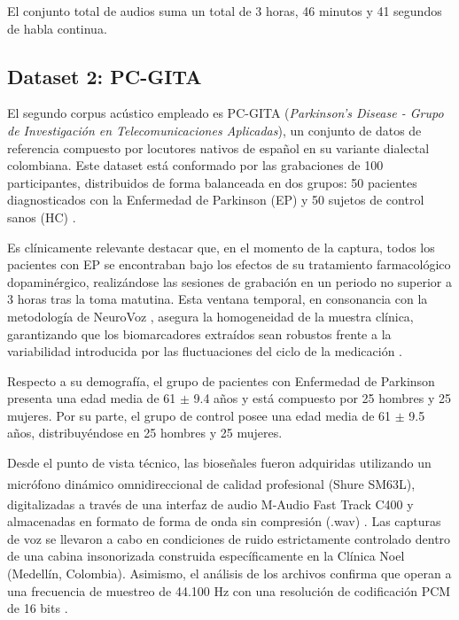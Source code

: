         El conjunto total de audios suma un total de 3 horas, 46 minutos y 41 segundos de habla continua.
    

    \subsection{Dataset 2: PC-GITA}
            El segundo corpus acústico empleado es PC-GITA (\textit{Parkinson's Disease - Grupo de Investigación en Telecomunicaciones Aplicadas}), un conjunto de datos de referencia compuesto por locutores nativos de español en su variante dialectal colombiana. Este dataset está conformado por las grabaciones de 100 participantes, distribuidos de forma balanceada en dos grupos: 50 pacientes diagnosticados con la Enfermedad de Parkinson (EP) y 50 sujetos de control sanos (HC) \cite{orozco2014}.

            Es clínicamente relevante destacar que, en el momento de la captura, todos los pacientes con EP se encontraban bajo los efectos de su tratamiento farmacológico dopaminérgico, realizándose las sesiones de grabación en un periodo no superior a 3 horas tras la toma matutina. Esta ventana temporal, en consonancia con la metodología de NeuroVoz \cite{mendes2024}, asegura la homogeneidad de la muestra clínica, garantizando que los biomarcadores extraídos sean robustos frente a la variabilidad introducida por las fluctuaciones del ciclo de la medicación \cite{orozco2014}.

            Respecto a su demografía, el grupo de pacientes con Enfermedad de Parkinson presenta una edad media de 61 $\pm$ 9.4 años y está compuesto por 25 hombres y 25 mujeres. Por su parte, el grupo de control posee una edad media de 61 $\pm$ 9.5 años, distribuyéndose en 25 hombres y 25 mujeres.

            Desde el punto de vista técnico, las bioseñales fueron adquiridas utilizando un micrófono dinámico omnidireccional de calidad profesional (Shure\textsuperscript{\tiny\textregistered} SM63L), digitalizadas a través de una interfaz de audio M-Audio\textsuperscript{\tiny\textregistered} Fast Track C400 y almacenadas en formato de forma de onda sin compresión (.wav) \cite{orozco2014}. Las capturas de voz se llevaron a cabo en condiciones de ruido estrictamente controlado dentro de una cabina insonorizada construida específicamente en la Clínica Noel (Medellín, Colombia). Asimismo, el análisis de los archivos confirma que operan a una frecuencia de muestreo de 44.100 Hz con una resolución de codificación PCM de 16 bits \cite{orozco2014}.

